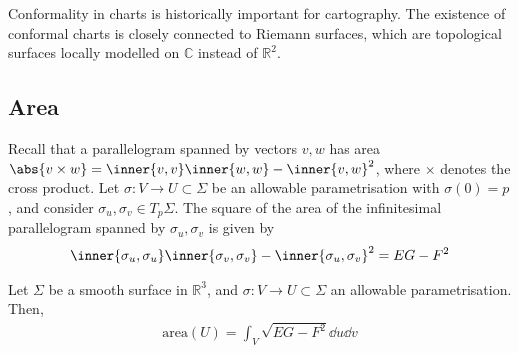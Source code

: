 \begin{remark}
	Conformality in charts is historically important for cartography.
	The existence of conformal charts is closely connected to Riemann surfaces, which are topological surfaces locally modelled on $\mathbb C$ instead of $\mathbb R^2$.
\end{remark}

\subsection{Area}
Recall that a parallelogram spanned by vectors $v, w$ has area $\abs{v \times w} = \inner{v,v}\inner{w,w} - \inner{v,w}^2$, where $\times$ denotes the cross product.
Let $\sigma \colon V \to U \subset \Sigma$ be an allowable parametrisation with $\sigma(0) = p$, and consider $\sigma_u, \sigma_v \in T_p \Sigma$.
The square of the area of the infinitesimal parallelogram spanned by $\sigma_u, \sigma_v$ is given by
\begin{align*}
	\inner{\sigma_u, \sigma_u}\inner{\sigma_v, \sigma_v} - \inner{\sigma_u, \sigma_v}^2 = EG - F^2
\end{align*}
\begin{definition}
	Let $\Sigma$ be a smooth surface in $\mathbb R^3$, and $\sigma \colon V \to U \subset \Sigma$ an allowable parametrisation.
	Then,
	\begin{align*}
		\mathrm{area}(U) = \int_V \sqrt{EG - F^2} \dd{u}\dd{v}
	\end{align*}
\end{definition}
